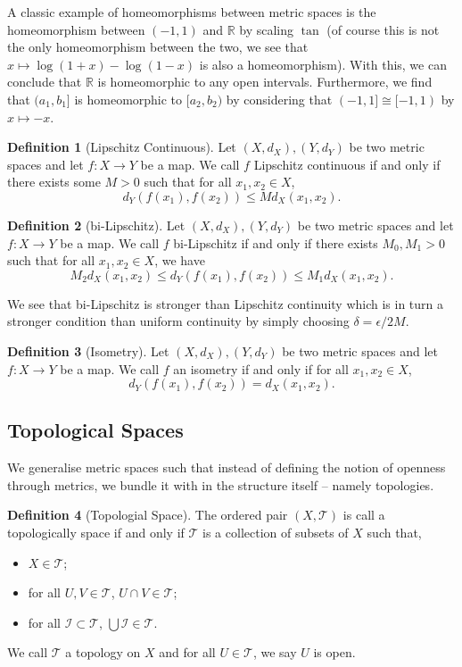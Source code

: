 \documentclass[
]{article}
\theoremstyle{definition}
\theoremstyle{definition}
\newtheorem{definition}{Definition}[section]
\begin{document}
A classic example of homeomorphisms between metric spaces is the
homeomorphism between \((-1, 1)\) and \(\mathbb{R}\) by scaling \(\tan\)
(of course this is not the only homeomorphism between the two, we see
that \(x \mapsto \log(1 + x) - \log(1 - x)\) is also a homeomorphism).
With this, we can conclude that \(\mathbb{R}\) is homeomorphic to any
open intervals. Furthermore, we find that \((a_1, b_1]\) is homeomorphic
to \([a_2, b_2)\) by considering that \((-1, 1] \cong [-1, 1)\) by
\(x \mapsto -x\).

\begin{definition}[Lipschitz Continuous]
  Let \((X, d_X), (Y, d_Y)\) be two metric spaces and let \(f : X \to Y\) be 
  a map. We call \(f\) Lipschitz continuous if and only if there exists some 
  \(M > 0\) such that for all \(x_1, x_2 \in X\), 
  \[d_Y(f(x_1), f(x_2)) \le M d_X(x_1, x_2).\]
\end{definition}

\begin{definition}[bi-Lipschitz]
  Let \((X, d_X), (Y, d_Y)\) be two metric spaces and let \(f : X \to Y\) be 
  a map. We call \(f\) bi-Lipschitz if and only if there exists \(M_0, M_1 > 0\) 
  such that for all \(x_1, x_2 \in X\), we have 
  \[M_2 d_X(x_1, x_2) \le d_Y(f(x_1), f(x_2)) \le M_1 d_X(x_1, x_2).\]
\end{definition}

We see that bi-Lipschitz is stronger than Lipschitz continuity which is
in turn a stronger condition than uniform continuity by simply choosing
\(\delta = \epsilon / 2M\).

\begin{definition}[Isometry]
  Let \((X, d_X), (Y, d_Y)\) be two metric spaces and let \(f : X \to Y\) be 
  a map. We call \(f\) an isometry if and only if for all \(x_1, x_2 \in X\),
  \[d_Y(f(x_1), f(x_2)) = d_X(x_1, x_2).\]
\end{definition}

\hypertarget{topological-spaces}{%
\subsection{Topological Spaces}\label{topological-spaces}}

We generalise metric spaces such that instead of defining the notion of
openness through metrics, we bundle it with in the structure itself --
namely topologies.

\begin{definition}[Topologial Space]
  The ordered pair \((X, \mathcal{T})\) is call a topologically space if and only 
  if \(\mathcal{T}\) is a collection of subsets of \(X\) such that, 
  \begin{itemize}
    \item \(X \in \mathcal{T}\);
    \item for all \(U, V \in \mathcal{T}\), \(U \cap V \in \mathcal{T}\);
    \item for all \(\mathcal{I} \subset \mathcal{T}\), 
      \(\bigcup \mathcal{I} \in \mathcal{T}\).
  \end{itemize}
  We call \(\mathcal{T}\) a topology on \(X\) and for all \(U \in \mathcal{T}\), 
  we say \(U\) is open.
\end{definition}
\end{document}
